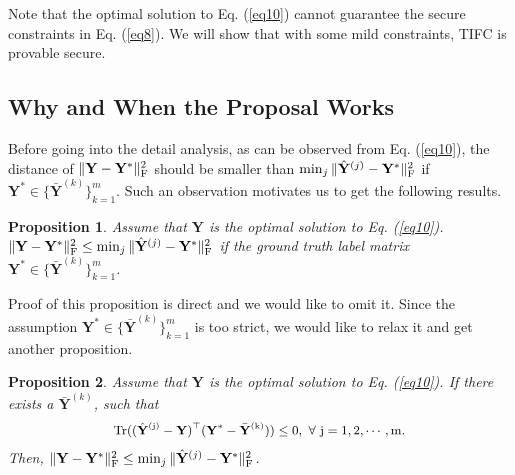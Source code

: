 \documentclass[10pt,journal,compsoc]{IEEEtran}
\newtheorem{theorem}{Proposition}
\begin{document}
Note that the optimal solution to Eq. (\ref{eq10}) cannot guarantee the secure constraints in Eq. (\ref{eq8}). We will show that with some mild constraints, TIFC is provable secure.

\subsection{Why and When the Proposal Works}

Before going into the detail analysis, as can be observed from Eq. (\ref{eq10}), the distance of $\|\mathbf{Y}- \mathbf{Y}^{*}\|_{\rm{F}}^2$ should be smaller than $\min_j \|\hat{\mathbf{Y}}^{(j)}- \mathbf{Y}^{*}\|_{\rm{F}}^2$ if $\mathbf{Y}^{*} \in \{\bar{\mathbf{Y}}^{(k)}\}_{k=1}^m$. Such an observation motivates us to get the following results.

\begin{theorem} \label{proposition1}
Assume that $\mathbf{Y}$ is the optimal solution to Eq. (\ref{eq10}). $\|\mathbf{Y}- \mathbf{Y}^{*}\|_{\rm{F}}^2 \leq \min_j \|\hat{\mathbf{Y}}^{(j)}- \mathbf{Y}^{*}\|_{\rm{F}}^2$ if the ground truth label matrix $\mathbf{Y}^{*} \in \{\bar{\mathbf{Y}}^{(k)}\}_{k=1}^m$.
\end{theorem}

Proof of this proposition is direct and we would like to omit it. Since the assumption $\mathbf{Y}^{*} \in \{\bar{\mathbf{Y}}^{(k)}\}_{k=1}^m$ is too strict, we would like to relax it and get another proposition.

\begin{theorem} \label{proposition2}
Assume that $\mathbf{Y}$ is the optimal solution to Eq. (\ref{eq10}). If there exists a $\bar{\mathbf{Y}}^{(k)}$, such that
\begin{equation}
\label{eq11}
\small{
\begin{split}
\rm{Tr} ((\hat{\mathbf{Y}}^{(j)}-\mathbf{Y})^\top ( \mathbf{Y}^{*}-\bar{\mathbf{Y}}^{(k)} )) \leq 0,~\forall~j=1,2,\cdots, m.
\end{split}}
\end{equation}
Then, $\|\mathbf{Y}- \mathbf{Y}^{*}\|_{\rm{F}}^2 \leq \min_j \| \hat{\mathbf{Y}}^{(j)}- \mathbf{Y}^{*}\|_{\rm{F}}^2$.
\end{theorem}
\end{document}
